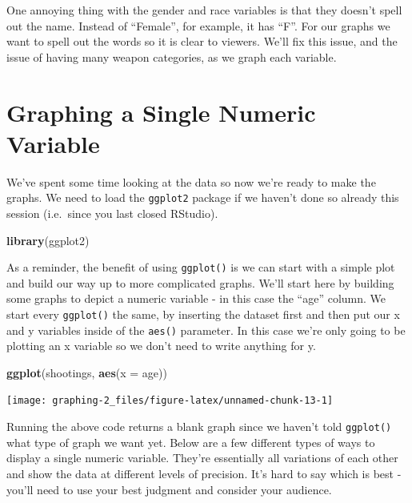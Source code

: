 \documentclass[
  12pt,
]{book}
\newenvironment{Shaded}{\begin{snugshade}}{\end{snugshade}}
\newcommand{\DataTypeTok}[1]{\textcolor[rgb]{0.13,0.29,0.53}{#1}}
\newcommand{\KeywordTok}[1]{\textcolor[rgb]{0.13,0.29,0.53}{\textbf{#1}}}
\newcommand{\NormalTok}[1]{#1}
\begin{document}
One annoying thing with the gender and race variables is that they doesn't spell out the name. Instead of ``Female'', for example, it has ``F''. For our graphs we want to spell out the words so it is clear to viewers. We'll fix this issue, and the issue of having many weapon categories, as we graph each variable.

\hypertarget{graphing-a-single-numeric-variable}{%
\section{Graphing a Single Numeric Variable}\label{graphing-a-single-numeric-variable}}

We've spent some time looking at the data so now we're ready to make the graphs. We need to load the \texttt{ggplot2} package if we haven't done so already this session (i.e.~since you last closed RStudio).

\begin{Shaded}
\begin{Highlighting}[]
\KeywordTok{library}\NormalTok{(ggplot2)}
\end{Highlighting}
\end{Shaded}

As a reminder, the benefit of using \texttt{ggplot()} is we can start with a simple plot and build our way up to more complicated graphs. We'll start here by building some graphs to depict a numeric variable - in this case the ``age'' column. We start every \texttt{ggplot()} the same, by inserting the dataset first and then put our x and y variables inside of the \texttt{aes()} parameter. In this case we're only going to be plotting an x variable so we don't need to write anything for y.

\begin{Shaded}
\begin{Highlighting}[]
\KeywordTok{ggplot}\NormalTok{(shootings, }\KeywordTok{aes}\NormalTok{(}\DataTypeTok{x =}\NormalTok{ age))}
\end{Highlighting}
\end{Shaded}

\begin{center}\texttt{[image: graphing-2\_files/figure-latex/unnamed-chunk-13-1]} \end{center}

Running the above code returns a blank graph since we haven't told \texttt{ggplot()} what type of graph we want yet. Below are a few different types of ways to display a single numeric variable. They're essentially all variations of each other and show the data at different levels of precision. It's hard to say which is best - you'll need to use your best judgment and consider your audience.
\end{document}
